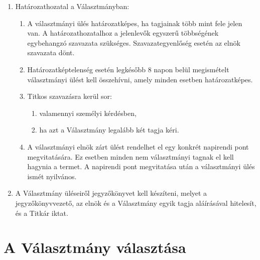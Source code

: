 \documentclass{../styles/rulebook}
\begin{document}
\begin{enumerate}
	\item Határozathozatal a Választmányban:
	\begin{enumerate}
		\item A választmányi ülés határozatképes, ha tagjainak több mint fele jelen van. A határozathozatalhoz a jelenlevők egyszerű többségének egybehangzó szavazata szükséges. Szavazategyenlőség esetén az elnök szavazata dönt.
		\item Határozatképtelenség esetén legkésőbb 8 napon belül megismételt választmányi ülést kell összehívni, amely minden esetben határozatképes.
		\item Titkos szavazásra kerül sor:
		\begin{enumerate}
			\item valamennyi személyi kérdésben,
			\item ha azt a Választmány legalább két tagja kéri.
		\end{enumerate}
		\item A választmányi elnök zárt ülést rendelhet el egy konkrét napirendi pont megvitatására. Ez esetben minden nem választmányi tagnak el kell hagynia a termet. A napirendi pont megvitatása után a választmányi ülés ismét nyilvános.
	\end{enumerate}
	\item A Választmány üléseiről jegyzőkönyvet kell készíteni, melyet a jegyzőkönyvvezető, az elnök és a Választmány egyik tagja aláírásával hitelesít, és a Titkár iktat.
\end{enumerate}


\section{A Választmány választása}
\end{document}

